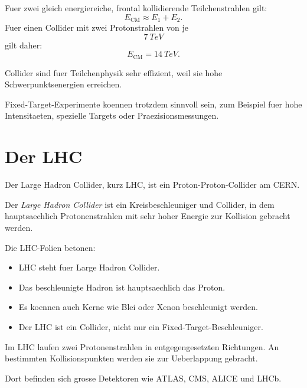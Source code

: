 \begin{formulabox}
Fuer zwei gleich energiereiche, frontal kollidierende Teilchenstrahlen gilt:
\[
    E_{\mathrm{CM}}
    \approx
    E_1+E_2.
\]
Fuer einen Collider mit zwei Protonstrahlen von je
\[
    \SI{7}{TeV}
\]
gilt daher:
\[
    E_{\mathrm{CM}}=\SI{14}{TeV}.
\]
\end{formulabox}

\begin{examtipbox}
Collider sind fuer Teilchenphysik sehr effizient, weil sie hohe
Schwerpunktsenergien erreichen.

Fixed-Target-Experimente koennen trotzdem sinnvoll sein, zum Beispiel fuer hohe
Intensitaeten, spezielle Targets oder Praezisionsmessungen.
\end{examtipbox}

\section{Der LHC}

Der Large Hadron Collider, kurz LHC, ist ein Proton-Proton-Collider am CERN.

\begin{definitionbox}
Der \emph{Large Hadron Collider} ist ein Kreisbeschleuniger und Collider, in dem
hauptsaechlich Protonenstrahlen mit sehr hoher Energie zur Kollision gebracht werden.
\end{definitionbox}

\begin{notebox}
Die LHC-Folien betonen:
\begin{itemize}
    \item LHC steht fuer Large Hadron Collider.
    \item Das beschleunigte Hadron ist hauptsaechlich das Proton.
    \item Es koennen auch Kerne wie Blei oder Xenon beschleunigt werden.
    \item Der LHC ist ein Collider, nicht nur ein Fixed-Target-Beschleuniger.
\end{itemize}
\end{notebox}

\begin{conceptbox}
Im LHC laufen zwei Protonenstrahlen in entgegengesetzten Richtungen.
An bestimmten Kollisionspunkten werden sie zur Ueberlappung gebracht.

Dort befinden sich grosse Detektoren wie ATLAS, CMS, ALICE und LHCb.
\end{conceptbox}

